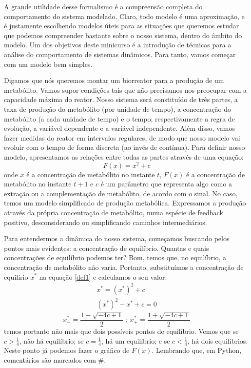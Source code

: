 \documentclass{article}
\begin{document}
A grande utilidade desse formalismo é a compreensão completa do comportamento do sistema modelado. Claro, todo modelo é uma aproximação, e é justamente escolhendo modelos úteis para as situações que queremos estudar que podemos compreender bastante sobre o nosso sistema, dentro do âmbito do modelo. Um dos objetivos deste minicurso é a introdução de técnicas para a análise do comportamento de sistemas dinâmicos. Para tanto, vamos começar com um modelo bem simples.

Digamos que nós queremos montar um biorreator para a produção de um metabólito. Vamos supor condições tais que não precisamos nos preocupar com a capacidade máxima do reator. Nosso sistema será constituído de três partes, a taxa de produção do metabólito (por unidade  de tempo), a concentração do metabólito (a cada unidade de tempo) e o tempo; respectivamente a regra de evolução, a variável dependente e a variável independente. Além disso, vamos fazer medidas do reator em intervalos regulares, de modo que nosso modelo vai evoluir com o tempo de forma discreta (ao invés de contínua). Para definir nosso modelo, apresentamos as relações entre todas as partes através de uma equação:
\begin{equation}
F(x) = x^2 + c
\label{def1}
\end{equation}
onde $x$ é a concentração de metabólito no instante $t$, $F(x)$ é a concentração de metabólito no instante $t+1$ e $c$ é um parâmetro que representa algo como a extração ou a complementação de metabólito, de acordo com o sinal. No caso, temos um modelo simplificado de produção metabólica. Expressamos a produção através da própria concentração de metabólito, numa espécie de feedback positivo, desconsiderando ou simplificando caminhos intermediários. 

Para entendermos a dinâmica do nosso sistema, começamos buscando pelos pontos mais evidentes: a concentração de equilíbrio. Quantas e quais concentrações de equilíbrio podemos ter? Bom, temos que, no equilíbrio, a concentração de metabólito não varia. Portanto, substituímos a concentração de equilírio $x^*$ na equação \ref{def1} e calculamos o seu valor:
\begin{eqnarray*}
x^* = (x^*)^2 + c \\
(x^*)^2 - x^* + c = 0 
\end{eqnarray*}
\begin{equation}
x^{*}_{-} = \frac{1-\sqrt{-4c+1}}{2} \textrm{ ; } x^*_+ = \frac{1+\sqrt{-4c+1}}{2}
\label{eq1}
\end{equation}
temos portanto não mais que dois possíveis pontos de equilíbrio. Vemos que se $c > \frac{1}{4}$, não há equilíbrio; se $c = \frac{1}{4}$, há um equilíbrio; e se $c < \frac{1}{4}$, há dois equilíbrios. Neste ponto já podemos fazer o gráfico de $F(x)$. Lembrando que, em Python, comentários são marcados com \#.
\end{document}
